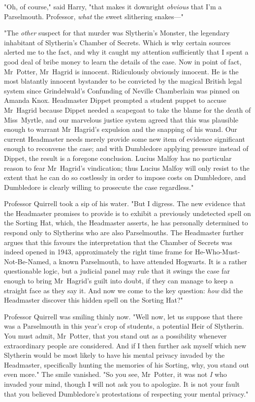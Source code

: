 "Oh, of course," said Harry, "that makes it downright \emph{obvious} that I'm a
Parselmouth. Professor, \emph{what} the sweet slithering snakes—"

"The \emph{other} suspect for that murder was Slytherin's Monster, the
legendary inhabitant of Slytherin's Chamber of Secrets. Which is why certain
sources alerted me to the fact, and why it caught my attention sufficiently
that I spent a good deal of bribe money to learn the details of the case. Now
in point of fact, Mr~Potter, Mr~Hagrid is innocent. Ridiculously obviously
innocent. He is the most blatantly innocent bystander to be convicted by the
magical British legal system since Grindelwald's Confunding of Neville
Chamberlain was pinned on Amanda Knox. Headmaster Dippet prompted a student
puppet to accuse Mr~Hagrid because Dippet needed a scapegoat to take the blame
for the death of Miss~Myrtle, and our marvelous justice system agreed that this
was plausible enough to warrant Mr~Hagrid's expulsion and the snapping of his
wand. Our current Headmaster needs merely provide some new item of evidence
significant enough to reconvene the case; and with Dumbledore applying pressure
instead of Dippet, the result is a foregone conclusion. Lucius Malfoy has no
particular reason to fear Mr~Hagrid's vindication; thus Lucius Malfoy will
only resist to the extent that he can do so costlessly in order to impose costs
on Dumbledore, and Dumbledore is clearly willing to prosecute the case
regardless."

Professor Quirrell took a sip of his water. "But I digress. The new evidence
that the Headmaster promises to provide is to exhibit a previously undetected
spell on the Sorting Hat, which, the Headmaster asserts, he has personally
determined to respond only to Slytherins who are also Parselmouths. The
Headmaster further argues that this favours the interpretation that the Chamber
of Secrets was indeed opened in 1943, approximately the right time frame for
He-Who-Must-Not-Be-Named, a known Parselmouth, to have attended Hogwarts. It is
a rather questionable logic, but a judicial panel may rule that it swings the
case far enough to bring Mr~Hagrid's guilt into doubt, if they can manage to
keep a straight face as they say it. And now we come to the key question:
\emph{how} did the Headmaster discover this hidden spell on the Sorting Hat?"

Professor Quirrell was smiling thinly now. "Well now, let us suppose that there
was a Parselmouth in this year's crop of students, a potential Heir of
Slytherin. You must admit, Mr~Potter, that you stand out as a possibility
whenever extraordinary people are considered. And if I then further ask myself
which new Slytherin would be most likely to have his mental privacy invaded by
the Headmaster, specifically hunting the memories of his Sorting, why, you
stand out even more." The smile vanished. "So you see, Mr~Potter, it was not
\emph{I} who invaded your mind, though I will not ask you to apologize. It is
not your fault that you believed Dumbledore's protestations of respecting your
mental privacy."

